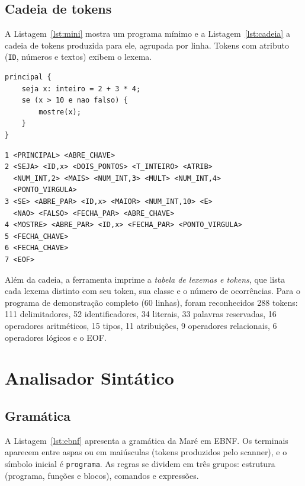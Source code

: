 \documentclass[conference]{IEEEtran}
\begin{document}
\subsection{Cadeia de tokens}
A Listagem~\ref{lst:mini} mostra um programa mínimo e a
Listagem~\ref{lst:cadeia} a cadeia de tokens produzida para ele, agrupada por
linha. Tokens com atributo (\texttt{ID}, números e textos) exibem o lexema.

\begin{lstlisting}[language=Mare,caption={Programa \texttt{mini.mare}.},label=lst:mini]
principal {
    seja x: inteiro = 2 + 3 * 4;
    se (x > 10 e nao falso) {
        mostre(x);
    }
}
\end{lstlisting}

\begin{lstlisting}[style=ebnf,caption={Cadeia de tokens gerada para \texttt{mini.mare}.},label=lst:cadeia]
1 <PRINCIPAL> <ABRE_CHAVE>
2 <SEJA> <ID,x> <DOIS_PONTOS> <T_INTEIRO> <ATRIB>
  <NUM_INT,2> <MAIS> <NUM_INT,3> <MULT> <NUM_INT,4>
  <PONTO_VIRGULA>
3 <SE> <ABRE_PAR> <ID,x> <MAIOR> <NUM_INT,10> <E>
  <NAO> <FALSO> <FECHA_PAR> <ABRE_CHAVE>
4 <MOSTRE> <ABRE_PAR> <ID,x> <FECHA_PAR> <PONTO_VIRGULA>
5 <FECHA_CHAVE>
6 <FECHA_CHAVE>
7 <EOF>
\end{lstlisting}

Além da cadeia, a ferramenta imprime a \emph{tabela de lexemas e tokens}, que
lista cada lexema distinto com seu token, sua classe e o número de
ocorrências. Para o programa de demonstração completo (60 linhas), foram
reconhecidos 288 tokens: 111 delimitadores, 52 identificadores, 34 literais,
33 palavras reservadas, 16 operadores aritméticos, 15 tipos, 11 atribuições,
9 operadores relacionais, 6 operadores lógicos e o EOF.

\section{Analisador Sintático}\label{sec:sint}

\subsection{Gramática}
A Listagem~\ref{lst:ebnf} apresenta a gramática da Maré em EBNF. Os terminais
aparecem entre aspas ou em maiúsculas (tokens produzidos pelo scanner), e o
símbolo inicial é \texttt{programa}. As regras se dividem em três grupos:
estrutura (programa, funções e blocos), comandos e expressões.
\end{document}
